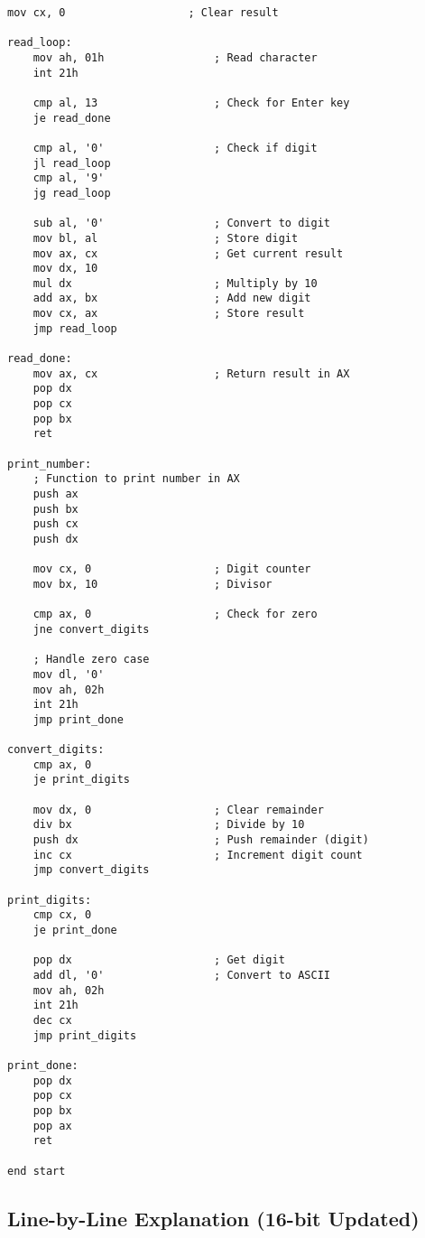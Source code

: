 \documentclass[12pt,a4paper]{article}
\begin{document}
\begin{lstlisting}[caption=16-bit Fibonacci Series Program with Multi-Digit Support]
    mov cx, 0                   ; Clear result
    
read_loop:
    mov ah, 01h                 ; Read character
    int 21h
    
    cmp al, 13                  ; Check for Enter key
    je read_done
    
    cmp al, '0'                 ; Check if digit
    jl read_loop
    cmp al, '9'
    jg read_loop
    
    sub al, '0'                 ; Convert to digit
    mov bl, al                  ; Store digit
    mov ax, cx                  ; Get current result
    mov dx, 10
    mul dx                      ; Multiply by 10
    add ax, bx                  ; Add new digit
    mov cx, ax                  ; Store result
    jmp read_loop

read_done:
    mov ax, cx                  ; Return result in AX
    pop dx
    pop cx
    pop bx
    ret

print_number:
    ; Function to print number in AX
    push ax
    push bx
    push cx
    push dx
    
    mov cx, 0                   ; Digit counter
    mov bx, 10                  ; Divisor
    
    cmp ax, 0                   ; Check for zero
    jne convert_digits
    
    ; Handle zero case
    mov dl, '0'
    mov ah, 02h
    int 21h
    jmp print_done
    
convert_digits:
    cmp ax, 0
    je print_digits
    
    mov dx, 0                   ; Clear remainder
    div bx                      ; Divide by 10
    push dx                     ; Push remainder (digit)
    inc cx                      ; Increment digit count
    jmp convert_digits
    
print_digits:
    cmp cx, 0
    je print_done
    
    pop dx                      ; Get digit
    add dl, '0'                 ; Convert to ASCII
    mov ah, 02h
    int 21h
    dec cx
    jmp print_digits
    
print_done:
    pop dx
    pop cx
    pop bx
    pop ax
    ret

end start
\end{lstlisting}

\subsection{Line-by-Line Explanation (16-bit Updated)}
\end{document}

